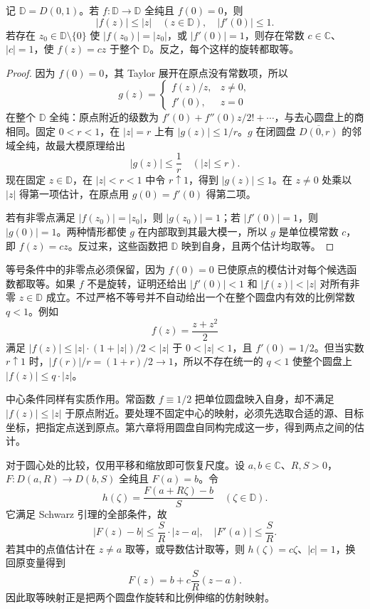 \begin{theorem}[Schwarz]\label{b3:thm:02-schwarz}
记 \(\mathbb D=D(0,1)\)。若 \(f:\mathbb D\to\mathbb D\) 全纯且 \(f(0)=0\)，则
\[
 |f(z)|\le|z|\quad(z\in\mathbb D),
 \quad |f'(0)|\le1.
\]
若存在 \(z_0\in\mathbb D\setminus\{0\}\) 使 \(|f(z_0)|=|z_0|\)，或 \(|f'(0)|=1\)，则存在常数 \(c\in\mathbb C\)、\(|c|=1\)，使 \(f(z)=cz\) 于整个 \(\mathbb D\)。反之，每个这样的旋转都取等。
\end{theorem}
\begin{proof}
因为 \(f(0)=0\)，其 Taylor 展开在原点没有常数项，所以
\[
 g(z)=
 \begin{cases}
 f(z)/z,&z\ne0,\\
 f'(0),&z=0
 \end{cases}
\]
在整个 \(\mathbb D\) 全纯：原点附近的级数为 \(f'(0)+f''(0)z/2!+\cdots\)，与去心圆盘上的商相同。固定 \(0<r<1\)，在 \(|z|=r\) 上有 \(|g(z)|\le1/r\)。\(g\) 在闭圆盘 \(\overline{D(0,r)}\) 的邻域全纯，故最大模原理给出
\[
 |g(z)|\le\frac1r\quad(|z|\le r).
\]
现在固定 \(z\in\mathbb D\)，在 \(|z|<r<1\) 中令 \(r\uparrow1\)，得到 \(|g(z)|\le1\)。在 \(z\ne0\) 处乘以 \(|z|\) 得第一项估计，在原点用 \(g(0)=f'(0)\) 得第二项。

若有非零点满足 \(|f(z_0)|=|z_0|\)，则 \(|g(z_0)|=1\)；若 \(|f'(0)|=1\)，则 \(|g(0)|=1\)。两种情形都使 \(g\) 在内部取到其最大模一，所以 \(g\) 是单位模常数 \(c\)，即 \(f(z)=cz\)。反过来，这些函数把 \(\mathbb D\) 映到自身，且两个估计均取等。
\end{proof}

等号条件中的非零点必须保留，因为 \(f(0)=0\) 已使原点的模估计对每个候选函数都取等。如果 \(f\) 不是旋转，证明还给出 \(|f'(0)|<1\) 和 \(|f(z)|<|z|\) 对所有非零 \(z\in\mathbb D\) 成立。不过严格不等号并不自动给出一个在整个圆盘内有效的比例常数 \(q<1\)。例如
\[
 f(z)=\frac{z+z^2}{2}
\]
满足 \(|f(z)|\le |z|\cdot(1+|z|)/2<|z|\) 于 \(0<|z|<1\)，且 \(f'(0)=1/2\)。但当实数 \(r\uparrow1\) 时，\(|f(r)|/r=(1+r)/2\to1\)，所以不存在统一的 \(q<1\) 使整个圆盘上 \(|f(z)|\le q\cdot|z|\)。

\ProseParagraphBreak

中心条件同样有实质作用。常函数 \(f\equiv1/2\) 把单位圆盘映入自身，却不满足 \(|f(z)|\le|z|\) 于原点附近。要处理不固定中心的映射，必须先选取合适的源、目标坐标，把指定点送到原点。第六章将用圆盘自同构完成这一步，得到两点之间的估计。

\ProseParagraphBreak

对于圆心处的比较，仅用平移和缩放即可恢复尺度。设 \(a,b\in\mathbb C\)、\(R,S>0\)，\(F:D(a,R)\to D(b,S)\) 全纯且 \(F(a)=b\)。令
\[
 h(\zeta)=\frac{F(a+R\zeta)-b}{S}\quad(\zeta\in\mathbb D).
\]
它满足 Schwarz 引理的全部条件，故
\[
 |F(z)-b|\le\frac SR\cdot|z-a|,
 \quad |F'(a)|\le\frac SR.
\]
若其中的点值估计在 \(z\ne a\) 取等，或导数估计取等，则 \(h(\zeta)=c\zeta\)、\(|c|=1\)，换回原变量得到
\[
 F(z)=b+c\frac SR(z-a).
\]
因此取等映射正是把两个圆盘作旋转和比例伸缩的仿射映射。

